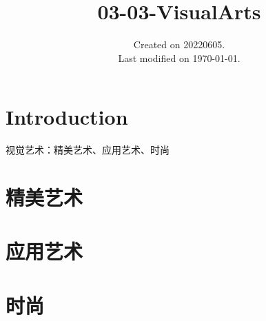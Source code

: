 \documentclass[UTF8]{../RepresentationUniverse}
\begin{document}
\title{03-03-VisualArts}
\date{Created on 20220605.\\   Last modified on \today.}
\maketitle
\tableofcontents


\chapter{Introduction}
视觉艺术：精美艺术、应用艺术、时尚


\chapter{精美艺术}

\chapter{应用艺术}

\chapter{时尚}
\end{document}
